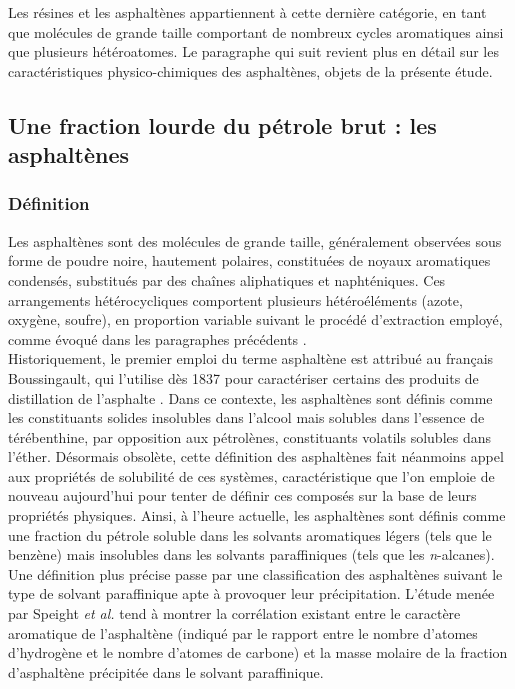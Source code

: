 Les résines et les asphaltènes appartiennent à cette dernière catégorie, en tant que molécules de grande taille comportant de nombreux cycles aromatiques ainsi que plusieurs hétéroatomes. Le paragraphe qui suit revient plus en détail sur les caractéristiques physico-chimiques des asphaltènes, objets de la présente étude. 

\subsection{Une fraction lourde du pétrole brut : les asphaltènes}


\subsubsection{Définition}

Les asphaltènes sont des molécules de grande taille, généralement observées sous forme de poudre noire, hautement polaires, constituées de noyaux aromatiques condensés, substitués par des chaînes aliphatiques et naphténiques. Ces arrangements hétérocycliques comportent plusieurs hétéroéléments (azote, oxygène, soufre), en proportion variable suivant le procédé d'extraction employé, comme évoqué dans les paragraphes précédents \cite{calles2007properties}.\\

Historiquement, le premier emploi du terme \og asphaltène \fg{} est attribué au français Boussingault, qui l'utilise dès 1837 pour caractériser certains des produits de distillation de l'asphalte \cite{goual2012petroleum}. Dans ce contexte, les \og asphaltènes \fg{} sont définis comme les constituants solides insolubles dans l'alcool mais solubles dans l'essence de térébenthine, par opposition aux \og pétrolènes\fg, constituants volatils solubles dans l'éther.
Désormais obsolète, cette définition des asphaltènes fait néanmoins appel aux propriétés de solubilité de ces systèmes, caractéristique que l'on emploie de nouveau aujourd'hui pour tenter de définir ces composés sur la base de leurs propriétés physiques. Ainsi, à l'heure actuelle, les asphaltènes sont définis comme une fraction du pétrole soluble dans les solvants aromatiques \og légers \fg{} (tels que le benzène) mais insolubles dans les solvants paraffiniques (tels que les \textit{n}-alcanes). Une définition plus précise passe par une classification des asphaltènes suivant le type de solvant paraffinique apte à provoquer leur précipitation. L'étude menée par Speight \textit{et al.} \cite{speight2004petroleum} tend à montrer la corrélation existant entre le caractère aromatique de l'asphaltène (indiqué par le rapport entre le nombre d'atomes d'hydrogène et le nombre d'atomes de carbone) et la masse molaire de la fraction d'asphaltène précipitée dans le solvant paraffinique.\\  

